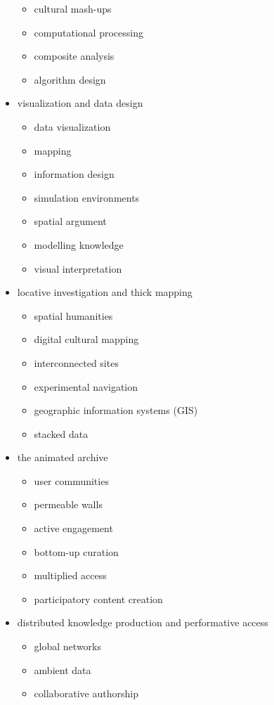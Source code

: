 \begin{itemize}
\begin{itemize}
    \item	cultural mash-ups
    \item	computational processing
    \item	composite analysis
    \item	algorithm design
  \end{itemize}
  \item visualization and data design
  \begin{itemize}
    \item data visualization
    \item	mapping
    \item	information design
    \item	simulation environments
    \item	spatial argument
    \item	modelling knowledge
    \item	visual interpretation
  \end{itemize}
  \item locative investigation and thick mapping
  \begin{itemize}
    \item spatial humanities
    \item	digital cultural mapping
    \item	interconnected sites
    \item	experimental navigation
    \item	geographic information systems (GIS)
    \item	stacked data
  \end{itemize}
  \item the animated archive
  \begin{itemize}
    \item user communities
    \item	permeable walls
    \item	active engagement
    \item	bottom-up curation
    \item	multiplied access
    \item	participatory content creation
  \end{itemize}
  \item distributed knowledge production and performative access
  \begin{itemize}
    \item global networks
    \item	ambient data
    \item	collaborative authorship

\end{itemize}
\end{itemize}
